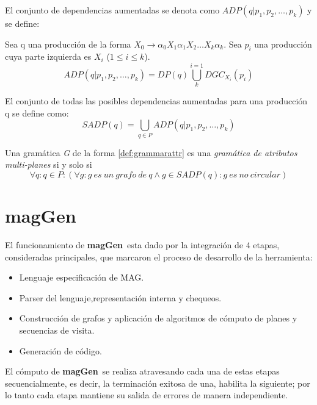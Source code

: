 \documentclass[runningheads,a4paper]{llncs}
\newcommand{\maggen}{\textbf{magGen}}
\begin{document}
El conjunto de dependencias aumentadas se denota como $ADP (q | p_{1}, p_{2}, \dots, p_{k})$ y se define:
\begin{definition}
Sea q una producción de la forma $X_{0}\rightarrow \alpha_{0} X_{1} \alpha_{1} X_{2} \dots X_{k} \alpha_{k}$. Sea $p_{i}$ una producción cuya parte izquierda es $X_{i}$ ($1\leqslant i \leqslant k$). 
\begin{equation}
ADP (q | p_{1}, p_{2}, \dots, p_{k}) = DP(q) \bigcup\limits_{k}^{i=1}{DGC_{X_{i}}} (p_{i})
\end{equation}
\end{definition}

\begin{definition}
El conjunto de todas las posibles dependencias aumentadas para una producción q se define como:
\begin{equation}
SADP(q) = \bigcup\limits_{q\in P}{ADP (q | p_{1}, p_{2}, \dots, p_{k})} 
\end{equation}
\end{definition}

\begin{definition}
Una gramática \textit{G} de la forma \ref{def:grammarattr} es una \textit{gramática de atributos multi-planes} si y solo si 
\begin{equation}
\forall q : q \in P: (\forall g:g\ es\ un\ grafo\ de\ q \wedge g \in SADP(q) : g\ es\ no\ circular) 
\end{equation}
\end{definition}


\section{\maggen}
El funcionamiento de \maggen\ esta dado por la integración de 4 etapas, consideradas principales, que marcaron el proceso de desarrollo de la herramienta:
\begin{itemize}
\item Lenguaje especificación de MAG.
\item Parser del lenguaje,representación interna y chequeos.
\item Construcción de grafos y aplicación de algoritmos de cómputo de planes y secuencias de visita.
\item Generación de código.
\end{itemize}

El cómputo de \maggen\ se realiza atravesando cada una de estas etapas secuencialmente, es decir, la terminación exitosa de una, habilita la siguiente; por lo tanto cada etapa mantiene su salida de errores de manera independiente. 
\end{document}
